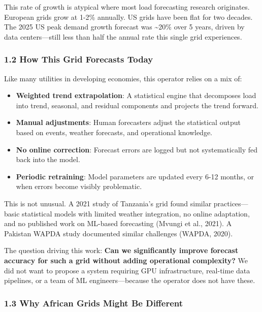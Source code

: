 This rate of growth is atypical where most load forecasting research
originates. European grids grow at 1-2\% annually. US grids have been
flat for two decades. The 2025 US peak demand growth forecast was
\textasciitilde20\% over 5 years, driven by data centers---still less
than half the annual rate this single grid experiences.

\subsubsection{1.2 How This Grid Forecasts
Today}\label{how-this-grid-forecasts-today}

Like many utilities in developing economies, this operator relies on a
mix of:

\begin{itemize}
\tightlist
\item
  \textbf{Weighted trend extrapolation}: A statistical engine that
  decomposes load into trend, seasonal, and residual components and
  projects the trend forward.
\item
  \textbf{Manual adjustments}: Human forecasters adjust the statistical
  output based on events, weather forecasts, and operational knowledge.
\item
  \textbf{No online correction}: Forecast errors are logged but not
  systematically fed back into the model.
\item
  \textbf{Periodic retraining}: Model parameters are updated every 6-12
  months, or when errors become visibly problematic.
\end{itemize}

This is not unusual. A 2021 study of Tanzania's grid found similar
practices---basic statistical models with limited weather integration,
no online adaptation, and no published work on ML-based forecasting
(Mvungi et al., 2021). A Pakistan WAPDA study documented similar
challenges (WAPDA, 2020).

The question driving this work: \textbf{Can we significantly improve
forecast accuracy for such a grid without adding operational
complexity?} We did not want to propose a system requiring GPU
infrastructure, real-time data pipelines, or a team of ML
engineers---because the operator does not have these.

\subsubsection{1.3 Why African Grids Might Be
Different}\label{why-african-grids-might-be-different}

